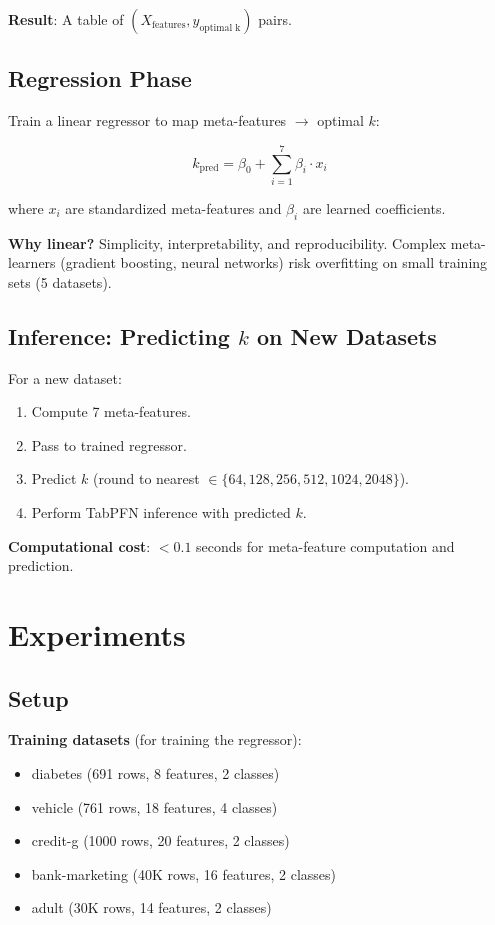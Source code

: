 \documentclass[11pt,a4paper]{article}
\begin{document}
\textbf{Result}: A table of $(X_{\text{features}}, y_{\text{optimal k}})$ pairs.

\subsection{Regression Phase}

Train a linear regressor to map meta-features $\to$ optimal $k$:

\begin{equation}
k_{\text{pred}} = \beta_0 + \sum_{i=1}^{7} \beta_i \cdot x_i
\label{eq:regression}
\end{equation}

\noindent
where $x_i$ are standardized meta-features and $\beta_i$ are learned coefficients.

\textbf{Why linear?} Simplicity, interpretability, and reproducibility. Complex meta-learners (gradient boosting, neural networks) risk overfitting on small training sets (5 datasets).

\subsection{Inference: Predicting $k$ on New Datasets}

For a new dataset:
\begin{enumerate}
\item Compute 7 meta-features.
\item Pass to trained regressor.
\item Predict $k$ (round to nearest $\in \{64, 128, 256, 512, 1024, 2048\}$).
\item Perform TabPFN inference with predicted $k$.
\end{enumerate}

\textbf{Computational cost}: $< 0.1$ seconds for meta-feature computation and prediction.

\section{Experiments}

\subsection{Setup}

\textbf{Training datasets} (for training the regressor):
\begin{itemize}
\item diabetes (691 rows, 8 features, 2 classes)
\item vehicle (761 rows, 18 features, 4 classes)
\item credit-g (1000 rows, 20 features, 2 classes)
\item bank-marketing (40K rows, 16 features, 2 classes)
\item adult (30K rows, 14 features, 2 classes)
\end{itemize}
\end{document}

